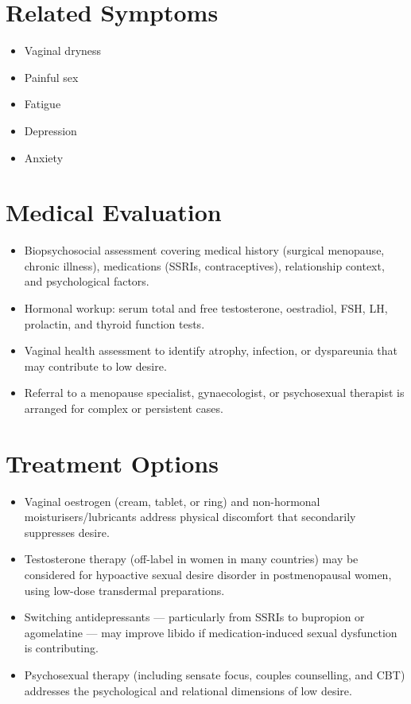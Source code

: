 \section*{Related Symptoms}
\begin{itemize}
  \item Vaginal dryness
  \item Painful sex
  \item Fatigue
  \item Depression
  \item Anxiety
\end{itemize}


\section*{Medical Evaluation}
\begin{itemize}
  \item Biopsychosocial assessment covering medical history (surgical menopause, chronic illness), medications (SSRIs, contraceptives), relationship context, and psychological factors.
  \item Hormonal workup: serum total and free testosterone, oestradiol, FSH, LH, prolactin, and thyroid function tests.
  \item Vaginal health assessment to identify atrophy, infection, or dyspareunia that may contribute to low desire.
  \item Referral to a menopause specialist, gynaecologist, or psychosexual therapist is arranged for complex or persistent cases.
\end{itemize}

\section*{Treatment Options}
\begin{itemize}
  \item Vaginal oestrogen (cream, tablet, or ring) and non-hormonal moisturisers/lubricants address physical discomfort that secondarily suppresses desire.
  \item Testosterone therapy (off-label in women in many countries) may be considered for hypoactive sexual desire disorder in postmenopausal women, using low-dose transdermal preparations.
  \item Switching antidepressants — particularly from SSRIs to bupropion or agomelatine — may improve libido if medication-induced sexual dysfunction is contributing.
  \item Psychosexual therapy (including sensate focus, couples counselling, and CBT) addresses the psychological and relational dimensions of low desire.
\end{itemize}

